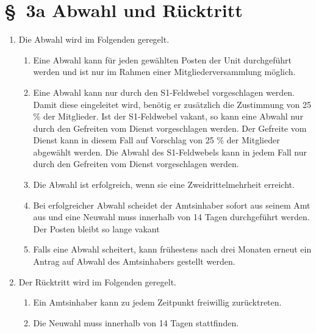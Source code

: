 \section*{\S~3a Abwahl und Rücktritt}
\label{sec:abwahl_ruecktritt}

\begin{enumerate}[label=(\arabic*)]
    \item Die Abwahl wird im Folgenden geregelt.
    \begin{enumerate}[label=(\Alph*)]
      \item Eine Abwahl kann für jeden gewählten Posten der Unit durchgeführt werden und ist nur im Rahmen einer Mitgliederversammlung möglich.
      \item Eine Abwahl kann nur durch den S1-Feldwebel vorgeschlagen werden. Damit diese eingeleitet wird, benötig er zusätzlich die Zustimmung von 25 \% der Mitglieder. Ist der S1-Feldwebel vakant, so kann eine Abwahl nur durch den Gefreiten vom Dienst vorgeschlagen werden. Der Gefreite vom Dienst kann in diesem Fall auf Vorschlag von 25 \% der Mitglieder abgewählt werden. Die Abwahl des S1-Feldwebels kann in jedem Fall nur durch den Gefreiten vom Dienst vorgeschlagen werden.
      \item Die Abwahl ist erfolgreich, wenn sie eine Zweidrittelmehrheit erreicht.
      \item Bei erfolgreicher Abwahl scheidet der Amtsinhaber sofort aus seinem Amt aus und eine Neuwahl muss innerhalb von 14 Tagen durchgeführt werden. Der Posten bleibt so lange vakant
      \item Falls eine Abwahl scheitert, kann frühestens nach drei Monaten erneut ein Antrag auf Abwahl des Amtsinhabers gestellt werden.
    \end{enumerate}
    \item Der Rücktritt wird im Folgenden geregelt.
      \begin{enumerate}[label=(\Alph*)]
      	\item Ein Amtsinhaber kann zu jedem Zeitpunkt freiwillig zurücktreten.
	\item Die Neuwahl muss innerhalb von 14 Tagen stattfinden.
    \end{enumerate}
\end{enumerate}